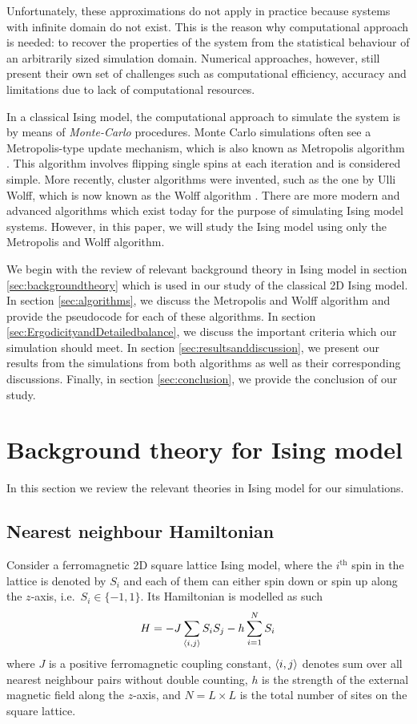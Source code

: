 \documentclass[pra,aps,superscriptaddress,amssymb,amsmath,reprint,noeprint,floatfix]{revtex4-2}
\begin{document}
Unfortunately, these approximations do not apply in practice because systems with infinite domain do not exist. This is the reason why computational approach is needed: to recover the properties of the system from the statistical behaviour of an arbitrarily sized simulation domain. Numerical approaches, however, still present their own set of challenges such as computational efficiency, accuracy and limitations due to lack of computational resources.

In a classical Ising model, the computational approach to simulate the system is by means of \textit{Monte-Carlo} procedures. Monte Carlo simulations often see a Metropolis-type update mechanism, which is also known as Metropolis algorithm \cite{doi:10.1063/1.1699114}. This algorithm involves flipping single spins at each iteration and is considered simple. More recently, cluster algorithms were invented, such as the one by Ulli Wolff, which is now known as the Wolff algorithm \cite{wolff_algo}. There are more modern and advanced algorithms which exist today for the purpose of simulating Ising model systems. However, in this paper, we will study the Ising model using only the Metropolis and Wolff algorithm.

We begin with the review of relevant background theory in Ising model in section \ref{sec:backgroundtheory} which is used in our study of the classical 2D Ising model. In section \ref{sec:algorithms}, we discuss the Metropolis and Wolff algorithm and provide the pseudocode for each of these algorithms. In section \ref{sec:ErgodicityandDetailedbalance}, we discuss the important criteria which our simulation should meet. In section \ref{sec:resultsanddiscussion}, we present our results from the simulations from both algorithms as well as their corresponding discussions. Finally, in section \ref{sec:conclusion}, we provide the conclusion of our study.

\section{\label{sec:backgroundtheory}Background theory for Ising model}
In this section we review the relevant theories in Ising model for our simulations.

\subsection{\label{subsec:hamiltonian}Nearest neighbour Hamiltonian}
Consider a ferromagnetic 2D square lattice Ising model, where the $i^\mathrm{th}$ spin in the lattice is denoted by $S_i$ and each of them can either spin down or spin up along the $z$-axis, i.e.\ $S_i\in\{-1,1\}$. Its Hamiltonian is modelled as such
\begin{equation}\label{eqn:hamltonian}
    H=-J\sum_{\braket{i,j}} S_iS_j-h\sum_{i=1}^{N} S_i
\end{equation}
where $J$ is a positive ferromagnetic coupling constant, $\braket{i,j}$ denotes sum over all nearest neighbour pairs without double counting, $h$ is the strength of the external magnetic field along the $z$-axis, and $N=L\times L$ is the total number of sites on the square lattice.
\end{document}
